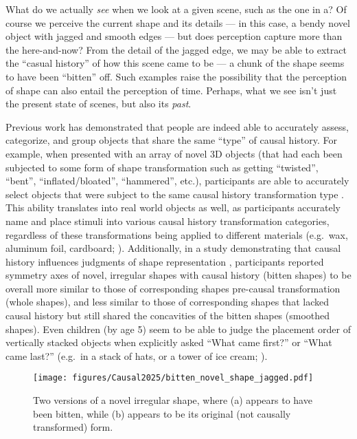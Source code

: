 What do we actually \textit{see} when we look at a given scene, such as the one in a?  Of course we perceive the current shape and its details --- in this case, a bendy novel object with jagged and smooth edges --- but does perception capture more than the here-and-now?  From the detail of the jagged edge, we may be able to extract the ``casual history'' of how this scene came to be --- a chunk of the shape seems to have been ``bitten'' off.  Such examples raise the possibility that the perception of shape can also entail the perception of time.  Perhaps, what we see isn’t just the present state of scenes, but also its \textit{past}.  

Previous work has demonstrated that people are indeed able to accurately assess, categorize, and group objects that share the same ``type'' of causal history.   For example, when presented with an array of novel 3D objects (that had each been subjected to some form of shape transformation such as getting ``twisted'', ``bent'', ``inflated/bloated'', ``hammered'', etc.), participants are able to accurately select objects that were subject to the same causal history transformation type \parencite{fleming_getting_2019, schmidt_visual_2019}.  This ability translates into real world objects as well, as participants accurately name and place stimuli into various causal history transformation categories, regardless of these transformations being applied to different materials (e.g.~wax, aluminum foil, cardboard; \cite{schmidt_identifying_2018}).  Additionally, in a study demonstrating that causal history influences judgments of shape representation \parencite{sprote_visual_2016}, participants reported symmetry axes of novel, irregular shapes with causal history (bitten shapes) to be overall more similar to those of corresponding shapes pre-causal transformation (whole shapes), and less similar to those of corresponding shapes that lacked causal history but still shared the concavities of the bitten shapes (smoothed shapes).  Even children (by age 5) seem to be able to judge the placement order of vertically stacked objects when explicitly asked “What came first?” or “What came last?” (e.g.~in a stack of hats, or a tower of ice cream; \cite{goulding_time_2025}).

\begin{figure}
    \centering
    \texttt{[image: figures/Causal2025/bitten\_novel\_shape\_jagged.pdf]}
    \caption
    {Two versions of a novel irregular shape, where (a) appears to have been bitten, while (b) appears to be its original (not causally transformed) form.}
    \label{fig:CausalHist_1}
\end{figure}

